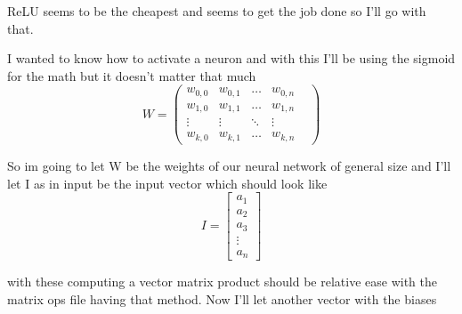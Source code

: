 \documentclass{article}
\begin{document}
\par{ReLU seems to be the cheapest and seems to get the job done so I'll go with that. }
\par{I wanted to know how to activate a neuron and with this I'll be using the sigmoid for the math but it doesn't matter that much}
$$W = \begin{pmatrix}
    w_{0,0} & w_{0,1} & \dots & w_{0,n} \\
    w_{1,0} & w_{1,1} & \dots & w_{1,n} \\
    \vdots  & \vdots & \ddots & \vdots \\
    w_{k,0} & w_{k,1} & \dots & w_{k,n} &  
\end{pmatrix}$$
\par{So im going to let W be the weights of our neural network of general size and I'll let I as in input be the input vector which should look like}
$$I = \begin{bmatrix}
    a_{1} \\
    a_{2} \\
    a_{3} \\
    \vdots \\
    a_{n}
\end{bmatrix}$$
\par{with these computing a vector matrix product should be relative ease with the matrix ops file having that method.
Now I'll let another vector with the biases}
\end{document}
